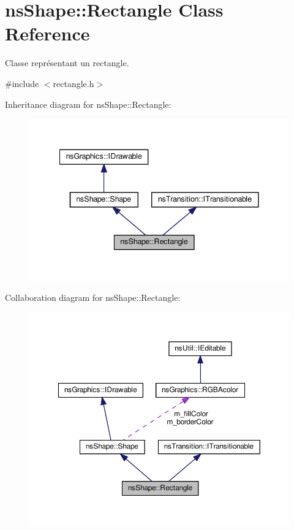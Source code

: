 \hypertarget{classns_shape_1_1_rectangle}{}\section{ns\+Shape\+:\+:Rectangle Class Reference}
\label{classns_shape_1_1_rectangle}


Classe représentant un rectangle.  




{\ttfamily \#include $<$rectangle.\+h$>$}



Inheritance diagram for ns\+Shape\+:\+:Rectangle\+:
\nopagebreak
\begin{figure}[H]
\begin{center}
\leavevmode
\includegraphics[width=341pt]{classns_shape_1_1_rectangle__inherit__graph}
\end{center}
\end{figure}


Collaboration diagram for ns\+Shape\+:\+:Rectangle\+:
\nopagebreak
\begin{figure}[H]
\begin{center}
\leavevmode
\includegraphics[width=350pt]{classns_shape_1_1_rectangle__coll__graph}
\end{center}
\end{figure}
